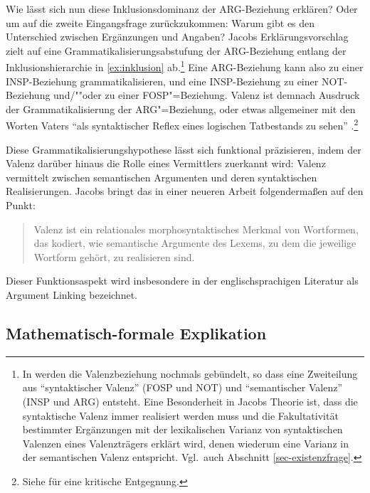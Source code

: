 Wie lässt sich nun diese Inklusionsdominanz der ARG-Beziehung erklären? Oder um auf die zweite Eingangsfrage zurückzukommen: Warum gibt es den Unterschied zwischen Ergänzungen und Angaben? Jacobs Erklärungsvorschlag zielt auf eine Grammatikalisierungsabstufung der ARG-Beziehung entlang der Inklusionshierarchie in \ref{ex:inklusion} ab.\footnote{In \cite{Jacobs:94a} werden die Valenzbeziehung nochmals gebündelt, so dass eine Zweiteilung aus  "`syntaktischer Valenz"' (FOSP und NOT) und "`semantischer Valenz"' (INSP und ARG) entsteht. Eine Besonderheit in Jacobs Theorie ist, dass die syntaktische Valenz immer realisiert werden muss und die Fakultativität bestimmter Ergänzungen mit der lexikalischen Varianz von syntaktischen Valenzen eines Valenzträgers erklärt wird, denen wiederum eine Varianz in der semantischen Valenz entspricht. Vgl.\ auch Abschnitt \ref{sec-existenzfrage}.}   
Eine ARG-Beziehung kann also zu einer INSP-Beziehung grammatikalisieren, und eine INSP-Bezie\-hung zu einer NOT-Bezie\-hung und/""oder zu einer FOSP"=Be\-ziehung. Valenz ist demnach Ausdruck der Grammatikalisierung der ARG"=Bezie\-hung, oder etwas allgemeiner mit den Worten Vaters "`als syntaktischer Reflex eines logischen Tatbestands zu sehen"' \citep[225]{Vater:81}.\footnote{Siehe \citet[205ff]{Agel:00} für eine kritische Entgegnung.}
  
Diese Grammatikalisierungshypothese lässt sich funktional präzisieren, indem der Valenz darüber hinaus die Rolle eines Vermittlers zuerkannt wird: Valenz vermittelt zwischen semantischen Argumenten und deren syntaktischen Realisierungen. Jacobs bringt das in einer neueren Arbeit folgenderma\ss en auf den Punkt: 

\begin{quote}
Valenz ist ein relationales morphosyntaktisches Merkmal von Wortformen, das kodiert, wie semantische Argumente des Lexems, zu dem die jeweilige Wortform gehört, zu realisieren sind. \cite[504]{Jacobs:09}
\end{quote}
Dieser Funktionsaspekt wird insbesondere in der englischsprachigen Literatur als Argument Linking bezeichnet.


\subsection{Mathematisch-formale Explikation}

